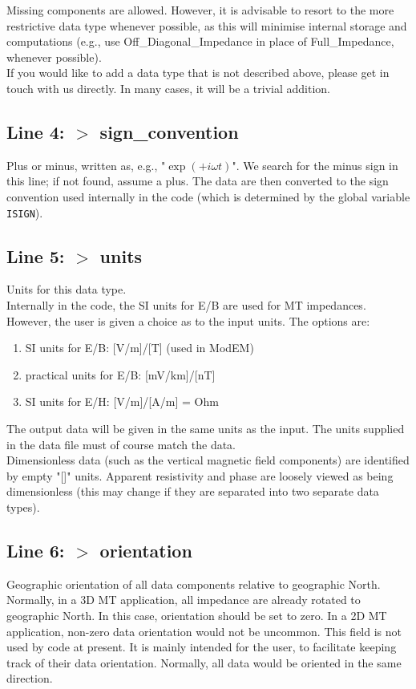 \documentclass[12pt]{article}
\begin{document}
\noindent
Missing components are allowed. However, it is advisable to resort to the more restrictive data type whenever possible, as this will minimise internal storage and computations (e.g., use Off\_Diagonal\_Impedance in place of Full\_Impedance, whenever possible).\\

If you would like to add a data type that is not described above, please get in touch with us directly. In many cases, it will be a trivial addition.

\subsection*{Line 4: $>$ sign\_convention}
Plus or minus, written as, e.g., "$\exp(+i\omega t)$". We search for the minus sign in this line; if not found, assume a plus. The data are then converted to the sign convention used internally in the code (which is determined by the global variable \verb"ISIGN").

\subsection*{Line 5: $>$ units}
Units for this data type.\\
Internally in the code, the SI units for E/B are used for MT impedances. However, the user is given a choice as to the input units. The options are:
\begin{enumerate}
  \item SI units for E/B: [V/m]/[T] (used in ModEM)
  \item practical units for E/B: [mV/km]/[nT]
  \item SI units for E/H: [V/m]/[A/m] = Ohm
\end{enumerate}
The output data will be given in the same units as the input. The units supplied in the data file must of course match the data.\\
Dimensionless data (such as the vertical magnetic field components) are identified by empty "[]" units. Apparent resistivity and phase are loosely viewed as being dimensionless (this may change if they are separated into two separate data types).

\subsection*{Line 6: $>$ orientation}
Geographic orientation of all data components relative to geographic North. Normally, in a 3D MT application, all impedance are already rotated to geographic North. In this case, orientation should be set to zero. In a 2D MT application, non-zero data orientation would not be uncommon. This field is not used by code at present. It is mainly intended for the user, to facilitate keeping track of their data orientation. Normally, all data would be oriented in the same direction.
\end{document}
